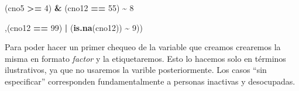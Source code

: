 \documentclass[
]{article}
\newenvironment{Shaded}{\begin{snugshade}}{\end{snugshade}}
\newcommand{\AttributeTok}[1]{\textcolor[rgb]{0.13,0.29,0.53}{#1}}
\newcommand{\DecValTok}[1]{\textcolor[rgb]{0.00,0.00,0.81}{#1}}
\newcommand{\FunctionTok}[1]{\textcolor[rgb]{0.13,0.29,0.53}{\textbf{#1}}}
\newcommand{\NormalTok}[1]{#1}
\newcommand{\OtherTok}[1]{\textcolor[rgb]{0.56,0.35,0.01}{#1}}
\newcommand{\SpecialCharTok}[1]{\textcolor[rgb]{0.81,0.36,0.00}{\textbf{#1}}}
\newcommand{\StringTok}[1]{\textcolor[rgb]{0.31,0.60,0.02}{#1}}
\begin{document}
\begin{Shaded}
\begin{Highlighting}[]
\NormalTok{                        (cno5 }\SpecialCharTok{\textgreater{}=} \DecValTok{4}\NormalTok{) }\SpecialCharTok{\&}\NormalTok{ (cno12 }\SpecialCharTok{==} \DecValTok{55}\NormalTok{) }\SpecialCharTok{\textasciitilde{}} \DecValTok{8}
                        
\NormalTok{                        ,(cno12 }\SpecialCharTok{==} \DecValTok{99}\NormalTok{) }\SpecialCharTok{|}\NormalTok{ (}\FunctionTok{is.na}\NormalTok{(cno12)) }\SpecialCharTok{\textasciitilde{}} \DecValTok{9}\NormalTok{))}
\end{Highlighting}
\end{Shaded}

Para poder hacer un primer chequeo de la variable que creamos crearemos la misma en formato \emph{factor} y la etiquetaremos. Esto lo hacemos solo en términos ilustrativos, ya que no usaremos la varible posteriormente. Los casos ``sin especificar'' corresponden fundamentalmente a personas inactivas y desocupadas.

\begin{Shaded}
\end{Shaded}
\end{document}
